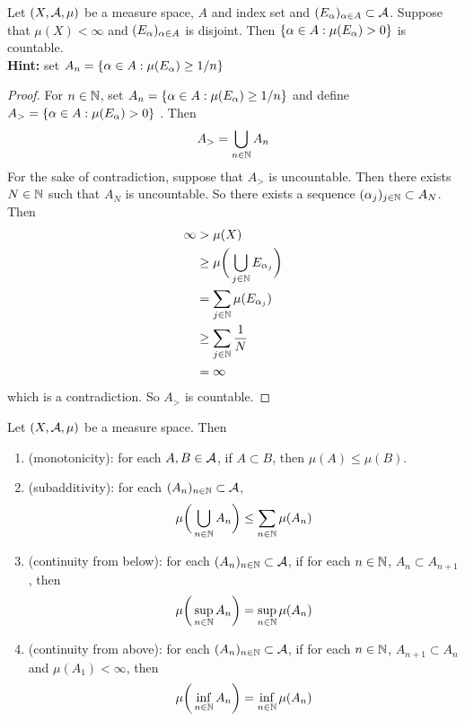 \documentclass{book}
\begin{document}
	\begin{ex} 
	Let $(X, \mathcal{A}, \mu)$ be a measure space, $A$ and index set and $(E_{\alpha})_{\alpha \in A} \subset \mathcal{A}$. Suppose that $\mu(X) < \infty$ and $(E_\alpha)_{\alpha \in A }$ is disjoint. Then $\{\alpha \in A: \mu(E_{\alpha}) >0\}$ is countable.\\
	\textbf{Hint:} set $A_n = \{\alpha \in A: \mu(E_{\alpha}) \geq 1/n \}$ 
	\end{ex}
	
	\begin{proof}
	For $n \in \mathbb{N}$, set $A_n = \{\alpha \in A: \mu(E_{\alpha}) \geq 1/n \}$ and define $ A_> = \{\alpha \in A: \mu(E_{\alpha}) >0\}$ . Then 
	$$A_> = \bigcup_{n \in \mathbb{N}}A_n$$
	For the sake of contradiction, suppose that 
	$A_>$ is uncountable. Then there exists $N \in \mathbb{N}$ such that $A_N$ is uncountable. So there exists a sequence $(\alpha_j)_{j \in \mathbb{N}} \subset A_N$. Then 
	\begin{align*}
	\infty 
	& > \mu(X) \\
	& \geq \mu \bigg( \bigcup_{j \in \mathbb{N}} E_{\alpha_{j}} \bigg) \\
	&= \sum_{j \in \mathbb{N}} \mu(E_{\alpha_j}) \\
	& \geq \sum_{j \in \mathbb{N}} \frac{1}{N} \\
	&= \infty
	\end{align*} 
	which is a contradiction. So $A_>$ is countable.
	\end{proof}
	
	\begin{ex} 
		Let $(X, \mathcal{A}, \mu)$ be a measure space. Then 
		\begin{enumerate}
			\item (monotonicity): for each $A,B \in \mathcal{A}$, if $A \subset B$, then $\mu(A) \leq \mu(B)$.
			\item (subadditivity): for each $(A_n)_{n \in \mathbb{N}} \subset \mathcal{A}$, $$\mu \bigg( \bigcup_{n \in \mathbb{N}} A_n \bigg) \leq \sum_{n \in \mathbb{N}}\mu(A_n)$$
			\item (continuity from below): for each $(A_n)_{n \in \mathbb{N}} \subset \mathcal{A}$, if for each $n \in \mathbb{N}$, $A_n \subset A_{n+1}$, then $$\mu\bigg(\sup_{n \in \mathbb{N}} A_n\bigg) = \sup_{n \in \mathbb{N}}\mu(A_n)$$
			\item (continuity from above): for each $(A_n)_{n \in \mathbb{N}} \subset \mathcal{A}$, if for each $n \in \mathbb{N}$, $ A_{n+1} \subset A_n$ and $\mu(A_1) < \infty$, then $$\mu\bigg(\inf_{n \in \mathbb{N}} A_n\bigg) = \inf_{n \in \mathbb{N}}\mu(A_n)$$
		\end{enumerate}
		
	\end{ex}
	
\end{document}
